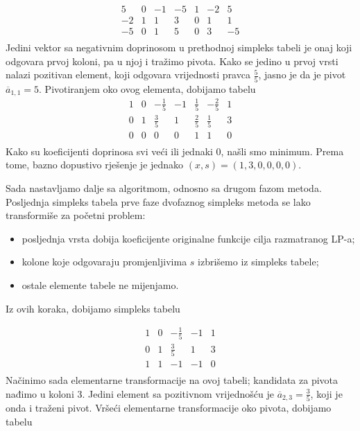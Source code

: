 \documentclass[b5paper, utf8, 11pt, colorlinks]{book}
\theoremstyle{definition}
\begin{document}
$$ \begin{array}{cccccc|c}
	5 & 0 & -1 & -5 & 1 & -2 & 5 \\
	-2&1  & 1 & 3 & 0 & 1 & 1 \\ \hline
	-5 & 0 & 1 & 5 & 0 & 3 & -5 \\
\end{array}
$$  
Jedini vektor sa negativnim doprinosom u prethodnoj simpleks tabeli je 
onaj koji odgovara prvoj koloni, pa u njoj i tražimo pivota.  
Kako se jedino u prvoj vrsti nalazi pozitivan element, koji odgovara vrijednosti pravca $\frac{5}{5}$, jasno je da je pivot $\overline{a}_{1,1}=5$. Pivotiranjem oko ovog elementa, dobijamo tabelu 
$$ \begin{array}{cccccc|c}
	1 & 0 & -\frac{1}{5}  & -1   &  \frac{1}{5}     & -\frac{2}{5}  & 1                    \\
	0 & 1 & \frac{3}{5}   &  1   &   \frac{2}{5}  & \frac{1}{5}      & 3                   \\ \hline
	0 & 0 & 0            &  0   &   1        & 1                     & 0                                 \\
\end{array}
$$
Kako su koeficijenti doprinosa svi veći ili jednaki 0, našli smo minimum. 
Prema tome, bazno dopustivo rješenje je jednako $(x, s)= (1,3, 0, 0, 0, 0)$. 

Sada nastavljamo dalje sa algoritmom, odnosno sa drugom fazom metoda.  Posljednja simpleks tabela prve faze dvofaznog simpleks metoda se lako transformiše za početni problem: 

\begin{itemize}
	\item posljednja vrsta dobija koeficijente originalne funkcije cilja razmatranog LP-a;
	\item kolone koje odgovaraju promjenljivima $s$ izbrišemo iz simpleks tabele;
	\item ostale elemente tabele ne mijenjamo.
\end{itemize}
Iz ovih koraka, dobijamo simpleks tabelu 

$$ \begin{array}{cccc|c}
	1 & 0 & -\frac{1}{5}     & -1   & 1 \\
	0 & 1 & \frac{3}{5}      & 1    & 3 \\ \hline
	1 & 1 & -1               & -1   & 0 \\
\end{array}
$$
Načinimo sada elementarne transformacije na ovoj tabeli; kandidata za pivota nađimo u 
koloni 3. Jedini element sa pozitivnom vrijednošću je $\overline{a}_{2,3} = \frac{3}{5}$, koji je onda i traženi pivot. 
Vršeći elementarne transformacije oko pivota, dobijamo tabelu 
\end{document}

